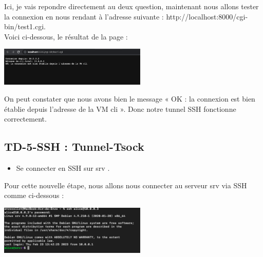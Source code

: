 \documentclass[12pt]{article}
\begin{document}
\vspace{0.3cm}

Ici, je vais repondre directement au deux question, maintenant nous allons tester la connexion en nous rendant à l'adresse suivante : http://localhost:8000/cgi-bin/test1.cgi. \\

Voici ci-dessous, le résultat de la page : 

\vspace{0.3cm}

\begin{center}
  \includegraphics[width=7cm]{Image-TD-SSH-5/Connexion-Cli.png}
\end{center}

\vspace{0.3cm}

On peut constater que nous avons bien le message « OK : la connexion est bien établie depuis l’adresse de la VM cli ». Donc notre tunnel SSH fonctionne correctement.

\newpage

\subsection{TD-5-SSH : Tunnel-Tsock}

\vspace{0.3cm}

\begin{itemize}
  \item Se connecter en SSH sur srv .
\end{itemize}

\vspace{0.3cm}

Pour cette nouvelle étape, nous allons nous connecter au serveur srv via SSH comme ci-dessous  : 

\vspace{0.3cm}

\begin{center}
  \includegraphics[width=7cm]{Image-TD-SSH-6/connexion-ssh-srv.png}
\end{center}
\end{document}
